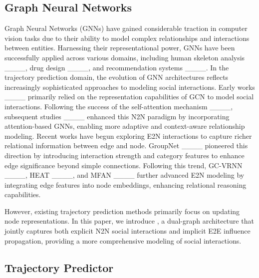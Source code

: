 \subsection{Graph Neural Networks}
Graph Neural Networks (GNNs) have gained considerable traction in computer vision tasks due to their ability to model complex relationships and interactions between entities. Harnessing their representational power, GNNs have been successfully applied across various domains, including human skeleton analysis ____, drug design ____, and recommendation systems ____. In the trajectory prediction domain, the evolution of GNN architectures reflects increasingly sophisticated approaches to modeling social interactions. Early works ____ primarily relied on the representation capabilities of GCN to model social interactions. Following the success of the self-attention mechanism ____, subsequent studies ____ enhanced this N2N paradigm by incorporating attention-based GNNs, enabling more adaptive and context-aware relationship modeling. Recent works have begun exploring E2N interactions to capture richer relational information between edge and node. GroupNet ____ pioneered this direction by introducing interaction strength and category features to enhance edge significance beyond simple connections. Following this trend, GC-VRNN ____, HEAT ____, and MFAN ____ further advanced E2N modeling by integrating edge features into node embeddings, enhancing relational reasoning capabilities. 

However, existing trajectory prediction methods primarily focus on updating node representations. In this paper, we introduce \modulename, a dual-graph architecture that jointly captures both explicit N2N social interactions and implicit E2E influence propagation, providing a more comprehensive modeling of social interactions.


\subsection{Trajectory Predictor}

